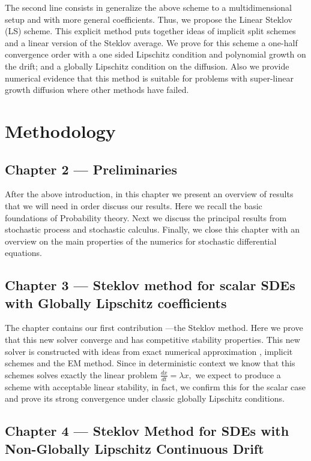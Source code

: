 		The second line consists in generalize the above scheme to a multidimensional setup and with more general 
	coefficients. Thus, we propose the Linear Steklov (LS) scheme. This explicit method puts together 
	ideas of implicit split schemes and a linear version of the Steklov average. We prove for this scheme a one-half 
	convergence order with a one sided Lipschitz condition and polynomial growth on the drift; and a globally 
	Lipschitz condition on the diffusion. Also we provide numerical evidence that this method is suitable for problems 
	with super-linear growth diffusion  where other methods have failed. 
	 
\section{Methodology}
		
	\subsection*{Chapter 2 --- Preliminaries}
			
			After the above introduction, in this chapter  we present an overview of results that we will need in order 
		 discuss our results. Here we recall the basic foundations of Probability theory. Next we discuss the
		 principal results from stochastic process and stochastic  calculus. Finally, we close this chapter with an 
		 overview on the main properties of the numerics for stochastic differential equations.
	
	\subsection*{Chapter 3 --- Steklov method for scalar SDEs with Globally Lipschitz coefficients}
	
			The chapter contains our first contribution ---the Steklov method. 
		Here we prove that this new solver converge and has competitive stability properties. This new solver is 
		constructed with ideas from exact numerical approximation \cite{Matus2005}, implicit schemes and the EM method. 
		Since in deterministic context we know that this schemes solves exactly the linear problem 
		$
			\frac{dx}{dt} = \lambda x,
		$
		we expect to produce a scheme with acceptable linear stability, in fact, we confirm this for the scalar case
		and prove its strong convergence under classic globally Lipschitz conditions. 
	
	\subsection*{Chapter 4 --- Steklov Method for SDEs with Non-Globally Lipschitz Continuous Drift}
	
